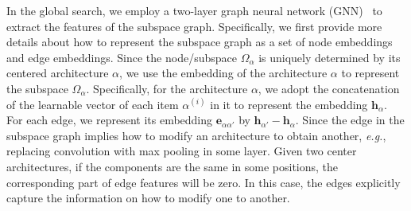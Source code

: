 \documentclass[lettersize,journal]{IEEEtran}
\def\eg{\emph{e.g.}} \def\Eg{\emph{E.g.}}
\begin{document}
{
In the global search, we employ a two-layer graph neural network (GNN)~\cite{you2020handling} to extract the features of the subspace graph.
Specifically, we first provide more details about how to represent the subspace graph as a set of node embeddings and edge embeddings.
Since the node/subspace $\Omega_{\alpha}$ is uniquely determined by its centered architecture $\alpha$, we use the embedding of the architecture $\alpha$ to represent the subspace $\Omega_{\alpha}$.
Specifically, for the architecture $\alpha$, we adopt the concatenation of the learnable vector of each item $\alpha^{(i)}$ in it to represent the embedding $\mathbf{h}_{\alpha}$.
For each edge, we represent its embedding $\mathbf{e}_{\alpha\alpha'}$ by $\mathbf{h}_{\alpha'} - \mathbf{h}_{\alpha}$.
Since the edge in the subspace graph implies how to modify an architecture to obtain another, \eg, replacing convolution with max pooling in some layer.
Given two center architectures, if the components are the same in some positions, the corresponding part of edge features will be zero.
In this case, the edges explicitly capture the information on how to modify one to another.

}
\end{document}
